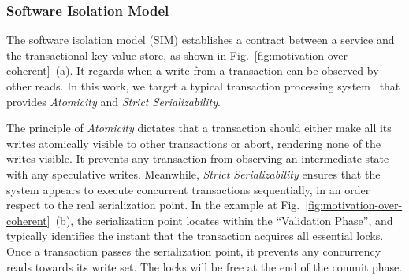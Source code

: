 

\subsubsection{Software Isolation Model}

The software isolation model (SIM) establishes a contract between a service and the transactional key-value store, as shown in Fig.~\ref{fig:motivation-over-coherent}~(a). It regards when a write from a transaction can be observed by other reads.  In this work, we target a typical transaction processing system~\cite{farm, drtm, compromise, timestone_asplos20, calvin, cicadia_sigmod17, tm_book, rss_sosp21} that provides \textit{Atomicity} and \textit{Strict Serializability}. 

The principle of \textit{Atomicity} dictates that a transaction should either make all its writes atomically visible to other transactions or abort, rendering none of the writes visible. It prevents any transaction from observing an intermediate state with any speculative writes. 
Meanwhile, \textit{Strict Serializability} ensures that the system appears to execute concurrent transactions sequentially, in an order respect to the real serialization point. In the example at Fig.~\ref{fig:motivation-over-coherent}~(b), the serialization point locates within the ``Validation Phase'', and typically identifies the instant that the transaction acquires all essential locks.
Once a transaction passes the serialization point, it prevents any concurrency reads towards its write set. The locks will be free at the end of the commit phase. 



